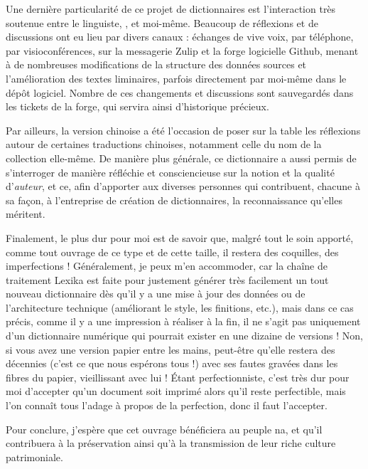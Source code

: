 Une dernière particularité de ce projet de dictionnaires est l’interaction très soutenue entre le linguiste, \alexisfra, et moi-même. Beaucoup de réflexions et de discussions ont eu lieu par divers canaux : échanges de vive voix, par téléphone, par visioconférences, sur la messagerie Zulip et la forge logicielle Github, menant à de nombreuses modifications de la structure des données sources et l’amélioration des textes liminaires, parfois directement par moi-même dans le dépôt logiciel. Nombre de ces changements et discussions sont sauvegardés dans les tickets de la forge, qui servira ainsi d’historique précieux.

Par ailleurs, la version chinoise a été l’occasion de poser sur la table les réflexions autour de certaines traductions chinoises, notamment celle du nom de la collection elle-même. De manière plus générale, ce dictionnaire a aussi permis de s’interroger de manière réfléchie et consciencieuse sur la notion et la qualité d’\emph{auteur}, et ce, afin d’apporter aux diverses personnes qui contribuent, chacune à sa façon, à l'entreprise de création de dictionnaires, la reconnaissance qu'elles méritent.

Finalement, le plus dur pour moi est de savoir que, malgré tout le soin apporté, comme tout ouvrage de ce type et de cette taille, il restera des coquilles, des imperfections ! Généralement, je peux m’en accommoder, car la chaîne de traitement Lexika est faite pour justement générer très facilement un tout nouveau dictionnaire dès qu’il y a une mise à jour des données ou de l’architecture technique (améliorant le style, les finitions, etc.), mais dans ce cas précis, comme il y a une impression à réaliser à la fin, il ne s’agit pas uniquement d’un dictionnaire numérique qui pourrait exister en une dizaine de versions ! Non, si vous avez une version papier entre les mains, peut-être qu’elle restera des décennies (c’est ce que nous espérons tous !) avec ses fautes gravées dans les fibres du papier, vieillissant avec lui ! Étant perfectionniste, c’est très dur pour moi d’accepter qu’un document soit imprimé alors qu’il reste perfectible, mais l’on connaît tous l’adage à propos de la perfection, donc il faut l’accepter.

Pour conclure, j'espère que cet ouvrage bénéficiera au peuple na, et qu'il contribuera à la préservation ainsi qu'à la transmission de leur riche culture patrimoniale.

\bigskip

\hfill \benjaminfra
